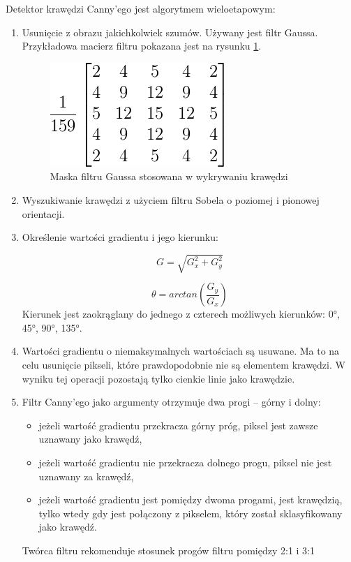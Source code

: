 Detektor krawędzi Canny'ego jest algorytmem wieloetapowym:
\begin{enumerate}
\item Usunięcie z obrazu jakichkolwiek szumów. Używany jest filtr Gaussa. Przykładowa macierz filtru pokazana jest na rysunku \ref{fig:canny_gauss}. %
\begin{figure}[h]
\centering
\includegraphics[scale=0.8]{img/canny_gauss.png}
\caption{Maska filtru Gaussa stosowana w wykrywaniu krawędzi}
\label{fig:canny_gauss}
\end{figure}
\item Wyszukiwanie krawędzi z użyciem filtru Sobela o poziomej i pionowej orientacji.
\item Określenie wartości gradientu i jego kierunku:

\begin{equation}
G=\sqrt{G_x^2+G_y^2}
\end{equation}

\begin{equation}
\theta=arctan(\frac{G_y}{G_x})
\end{equation}
Kierunek jest zaokrąglany do jednego z czterech możliwych kierunków: \ang{0}, \ang{45}, \ang{90}, \ang{135}.

\item Wartości gradientu o niemaksymalnych wartościach są usuwane. %
Ma to na celu usunięcie pikseli, które prawdopodobnie nie są elementem krawędzi. 
W wyniku tej operacji pozostają tylko cienkie linie jako krawędzie.

\item Filtr Canny'ego jako argumenty otrzymuje dwa progi -- górny i dolny:
\begin{itemize}
\item jeżeli wartość gradientu przekracza górny próg, piksel jest zawsze uznawany jako krawędź,
\item jeżeli wartość gradientu nie przekracza dolnego progu, piksel nie jest uznawany za krawędź,
\item jeżeli wartość gradientu jest pomiędzy dwoma progami, jest krawędzią, tylko wtedy gdy jest połączony z pikselem, który został sklasyfikowany jako krawędź.
\end{itemize}
Twórca filtru rekomenduje stosunek progów filtru pomiędzy 2:1 i 3:1
\end{enumerate}